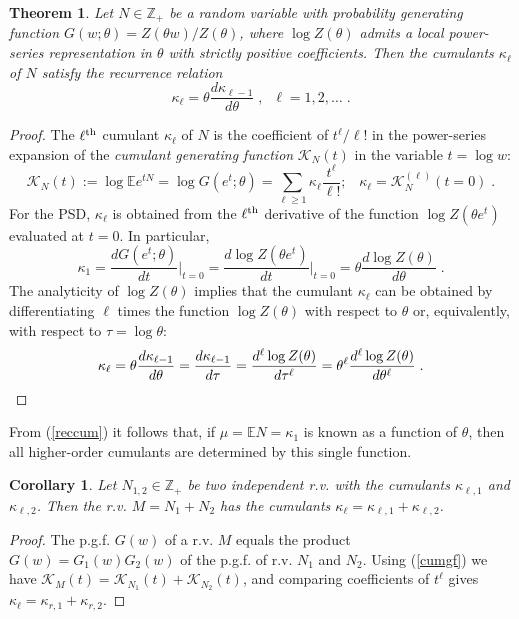 \documentclass[a4paper,12pt]{amsart}
\newcommand{\E}{\mathbb{E}}
\newcommand{\Z}{\mathbb{Z}_{+}}
\newtheorem{Theorem}{Theorem}[section]
\newtheorem{Corollary}{Corollary}[section]
\theoremstyle{definition}
\theoremstyle{remark}
\begin{document}
\begin{Theorem}\label{PSDcum}{\rm \cite{Khatri1959}} 
Let $N\in\Z$ be a random variable with probability generating function $G(w;\theta)=Z(\theta w)/Z(\theta)$, where $\log Z(\theta)$ admits a local power-series representation in $\theta$ with strictly positive coefficients. Then the cumulants $\kappa_{\ell}$ of $N$ satisfy the recurrence relation
\begin{equation} \label{reccum1}
\kappa_{\ell}=\theta \frac{d\kappa_{\ell-1}}{d\theta}\;,\;\; \ell=1,2,\ldots\;.
\end{equation}
\end{Theorem}
\begin{proof}
The $\ell^{\rm th}$ cumulant $\kappa_{\ell}$ of $N$ is the coefficient of $t^{\ell}/\ell!$ in the power-series expansion of the {\it cumulant generating function} $\mathcal{K}_{N}(t)$ in the variable $t=\log w$:
\begin{equation}\label{cumgf}
\mathcal{K}_{N}(t):= \log \E e^{tN} =\log G(e^t;\theta) 
= \sum_{\ell \geq 1}\kappa_{\ell}\frac{ t^{\ell}}{\ell!};\;\;\; \kappa_{\ell}=\mathcal{K}_N^{(\ell)}(t=0) \;.
\end{equation}  
For the PSD, $\kappa_{\ell}$ is obtained from the $\ell^{\rm th}$ derivative of the function $\log Z(\theta e^t)$ evaluated at $t=0$. In particular,
\begin{equation}\label{reccum_m}
\kappa_{1}  =\frac{dG(e^t;\theta)}{dt}\Big|_{t=0}= \frac{d\log Z(\theta e^t)}{dt}\Big|_{t=0} = \theta \frac{d\log Z(\theta)}{d\theta}\;.
\end{equation}
The analyticity of $\log Z(\theta)$ implies that the cumulant $\kappa_{\ell}$ can be obtained by differentiating $\ell$ times the function $\log Z(\theta)$ with respect to $\theta$ or, equivalently, with respect to $\tau=\log \theta$:
\begin{equation}\label{reccum}
    \kappa_{\ell} =\theta \frac{d \kappa_{\ell-1}}{d\theta} = \frac{d\kappa_{\ell-1}}{d\tau}=\frac{d^{\ell}\log Z(\theta)}{d\tau^{\ell}} =
    \theta^{\ell}\frac{d^{\ell}\log Z(\theta)}{d\theta^{\ell}}\;.
    \vspace{-.5cm}
\end{equation}
\end{proof}
From (\ref{reccum}) it follows that, if $\mu=\E N = \kappa_1$ is known as a function of $\theta$, then all higher-order cumulants are determined by this single function.

\begin{Corollary}\label{addcum}
Let $N_{1,2}\in \Z $ be two independent r.v. with the cumulants $\kappa_{\ell,1}$ and $\kappa_{\ell,2}$. Then the r.v. $M=N_1+N_2$ has the cumulants $\kappa_{\ell}=\kappa_{\ell,1}+\kappa_{\ell,2}$.
\end{Corollary}
\begin{proof}
The p.g.f. $G(w)$ of a r.v. $M$  equals the product $G(w)=G_1(w)G_2(w)$ of the p.g.f. of r.v. $N_1$ and $N_2$. Using  (\ref{cumgf}) we  have $\mathcal{K}_{M}(t) = \mathcal{K}_{N_1}(t) +\mathcal{K}_{N_2}(t)$, and comparing coefficients of $t^{\ell}$ gives $\kappa_{\ell}=\kappa_{r,1}+\kappa_{r,2}$.
\end{proof}
\end{document}
